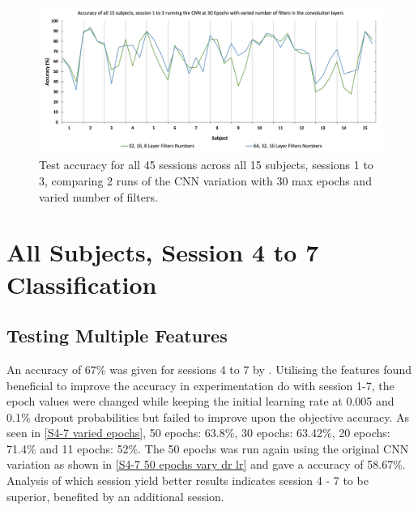 \begin{figure}[H]
\centering
\includegraphics[scale=0.5]{Media/SBJ1-15_S1-3/SBJ1-15&S1-3_30_Epochs_Varied_No_Of_Filters_Accuracy.png}
\caption{Test accuracy for all 45 sessions across all 15 subjects, sessions 1 to 3, comparing 2 runs of the CNN variation with 30 max epochs and varied number of filters.}
\label{S1-3 30 epochs varied filters}
\end{figure}

\section{All Subjects, Session 4 to 7 Classification}
\label{All Subjects, Session 4 to 7 Classification Section}

\subsection{Testing Multiple Features}
\label{All Subjects, 4-7 Multiple Features SubSection}

An accuracy of 67\% was given for sessions 4 to 7 by \cite{PalaniPaper}. Utilising the features found beneficial to improve the accuracy in experimentation do with session 1-7, the epoch values were changed while keeping the initial learning rate at 0.005 and 0.1\% dropout probabilities but failed to improve upon the objective accuracy. As seen in \cref{S4-7 varied epochs}, 50 epochs: 63.8\%, 30 epochs: 63.42\%, 20 epochs: 71.4\% and 11 epochs: 52\%. The 50 epochs was run again using the original CNN variation as shown in \cref{S4-7 50 epochs vary dr lr} and gave a accuracy of 58.67\%. Analysis of which session yield better results indicates session 4 - 7 to be superior, benefited by an additional session. 

